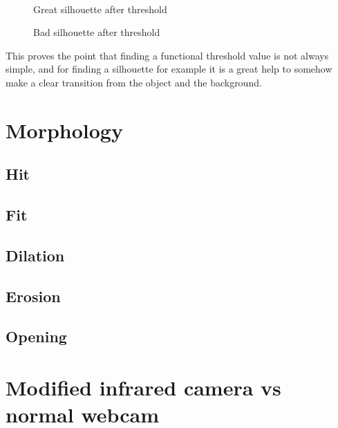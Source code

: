 \begin{figure}[htbp]
\begin{minipage}[b]{0.45\textwidth}
\end{minipage} \\ %
\begin{minipage}[t]{0.45\textwidth}
\caption{Great silhouette after threshold} %
\label{fig:SimpleThresholdAfter}
\end{minipage} \hfill
\begin{minipage}[t]{0.45\textwidth}
\caption{Bad silhouette after threshold} %
\label{fig:ComplicatedThresholdAfter}
\end{minipage}
\end{figure}
 
This proves the point that finding a functional threshold value is not always simple, and for finding a silhouette for example it is a great help to somehow make a clear transition from the object and the background.

\section{Morphology}
\subsection{Hit}
\subsection{Fit}
\subsection{Dilation}
\subsection{Erosion}
\subsection{Opening}
\section{Modified infrared camera vs normal webcam}
